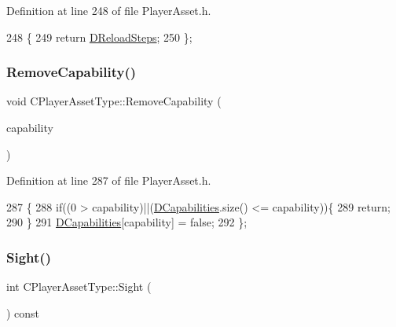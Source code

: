 Definition at line 248 of file Player\+Asset.\+h.


\begin{DoxyCode}
248                                \{
249             \textcolor{keywordflow}{return} \hyperlink{classCPlayerAssetType_a192d6ac421608663d18d1a0cda00841e}{DReloadSteps};  
250         \};
\end{DoxyCode}
\hypertarget{classCPlayerAssetType_a87e2ba8eecf6877a42fb9f31df4248bb}{}\label{classCPlayerAssetType_a87e2ba8eecf6877a42fb9f31df4248bb} 
\subsubsection{\texorpdfstring{Remove\+Capability()}{RemoveCapability()}}
{\footnotesize\ttfamily void C\+Player\+Asset\+Type\+::\+Remove\+Capability (\begin{DoxyParamCaption}\item[{\hyperlink{GameDataTypes_8h_a35b98ce26aca678b03c6f9f76e4778ce}{E\+Asset\+Capability\+Type}}]{capability }\end{DoxyParamCaption})\hspace{0.3cm}{\ttfamily [inline]}}



Definition at line 287 of file Player\+Asset.\+h.


\begin{DoxyCode}
287                                                               \{
288             \textcolor{keywordflow}{if}((0 > capability)||(\hyperlink{classCPlayerAssetType_a243f9161c56446b378dc42b51977fc58}{DCapabilities}.size() <= capability))\{
289                 \textcolor{keywordflow}{return};
290             \}
291             \hyperlink{classCPlayerAssetType_a243f9161c56446b378dc42b51977fc58}{DCapabilities}[capability] = \textcolor{keyword}{false};
292         \};
\end{DoxyCode}
\hypertarget{classCPlayerAssetType_aaa744aa1d6c284f91e46dfc7c04bef88}{}\label{classCPlayerAssetType_aaa744aa1d6c284f91e46dfc7c04bef88} 
\subsubsection{\texorpdfstring{Sight()}{Sight()}}
{\footnotesize\ttfamily int C\+Player\+Asset\+Type\+::\+Sight (\begin{DoxyParamCaption}{ }\end{DoxyParamCaption}) const\hspace{0.3cm}{\ttfamily [inline]}}



